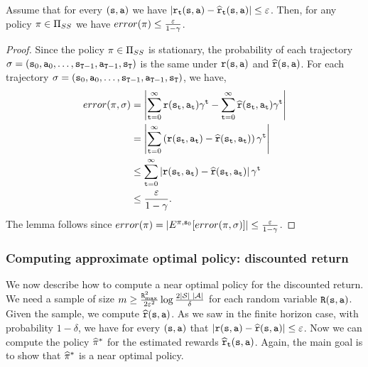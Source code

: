 \begin{lemma}
\label{lemma:approx-disc-error}
%
Assume that for every $({\tt s},{\tt a})$ we have
$|{\tt r}_{\tt t}({\tt s},{\tt a})-\widehat{{\tt r}}_{\tt t}({\tt s},{\tt a})|\leq
\varepsilon$. Then, for any policy $\pi\in {\Pi _{SS}}$ we have
$error(\pi)\leq \frac{\varepsilon}{1-\gamma}$.
\end{lemma}

\begin{proof}
Since the policy $\pi\in {\Pi _{SS}}$ is stationary, the
probability of each trajectory $\sigma=({\tt s}_0,{\tt a}_0,\ldots,
{\tt s}_{{\tt T}-1},{\tt a}_{{\tt T}-1},{\tt s}_{\tt T})$ is the
same under ${\tt r}({\tt s},{\tt a})$ and
$\widehat{{\tt r}}({\tt s},{\tt a})$. For each trajectory
$\sigma=({\tt s}_0,{\tt a}_0,\ldots,
{\tt s}_{{\tt T}-1},{\tt a}_{{\tt T}-1},{\tt s}_{\tt T})$, we
have,
\begin{align*}
error(\pi,\sigma)&=\left|\sum_{{\tt t}=0}^\infty
{\tt r}({\tt s}_{\tt t},{\tt a}_{\tt t})\gamma^{\tt t}
-\sum_{{\tt t}=0}^\infty
\widehat{{\tt r}}({\tt s}_{\tt t},{\tt a}_{\tt t})\gamma^{\tt t} \right| \\
&= \left|\sum_{{\tt t}=0}^\infty \left({\tt r}({\tt s}_{\tt t},{\tt a}_{\tt t})-\widehat{{\tt r}}({\tt s}_{\tt t},{\tt a}_{\tt t})\right)\gamma^{\tt t} \right|\\
&\leq \sum_{{\tt t}=0}^\infty \left|{\tt r}({\tt s}_{\tt t},{\tt a}_{\tt t})-\widehat{{\tt r}}({\tt s}_{\tt t},{\tt a}_{\tt t})\right|\gamma^{\tt t} \\
&\leq \frac{\varepsilon}{1-\gamma} .
\end{align*}
The lemma follows since
$error(\pi)=|E^{\pi,{\tt s}_0}[error(\pi,\sigma)]|\leq
\frac{\varepsilon}{1-\gamma}$.
\end{proof}

\subsubsection{Computing approximate optimal policy: discounted return}

We now describe how to compute a near optimal policy for the
discounted return.
We need a sample of size $m\geq \frac{{\tt R}_{\max }^2}{2\varepsilon^2}\log
\frac{2|\mathcal{S}|\;|\mathcal{A}|}{\delta}$ for each random variable
${\tt R}({\tt s},{\tt a})$. Given the sample, we compute
$\widehat{{\tt r}}({\tt s},{\tt a})$. As we saw in the finite horizon
case, with probability $1-\delta$, we have for every
$({\tt s},{\tt a})$ that
$|{\tt r}({\tt s},{\tt a})-\widehat{{\tt r}}({\tt s},{\tt a})|\leq
\varepsilon$. Now we can compute the policy $\widehat{\pi}^*$
for the estimated rewards
$\widehat{{\tt r}}_{\tt t}({\tt s},{\tt a})$. Again, the main goal is
to show that $\widehat{\pi}^*$ is a near optimal policy.

